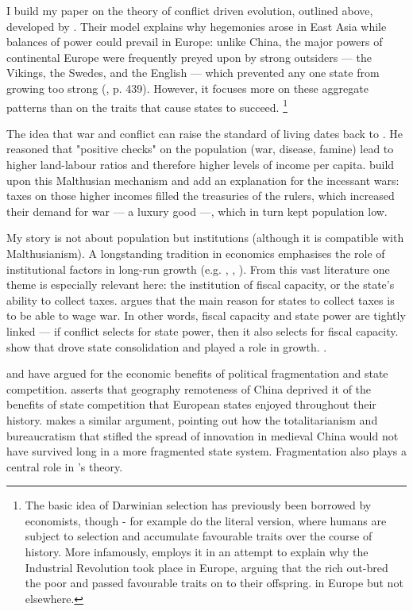 \documentclass{article}
\begin{document}
I build my paper on the theory of conflict driven evolution, outlined above, developed by \cite{levine2013, levine2021, levine2022}. Their model explains why hegemonies arose in East Asia while balances of power could prevail in Europe: unlike China, the major powers of continental Europe were frequently preyed upon by strong outsiders --- the Vikings, the Swedes, and the English --- which prevented any one state from growing too strong (\citealp{levine2021}, p. 439).
However, it focuses more on these aggregate patterns than on the traits that cause states to succeed.
\footnote{The basic idea of Darwinian selection has previously been borrowed by economists, though - for example \cite{galor2002} do the literal version, where humans are subject to selection and accumulate favourable traits over the course of history. More infamously, \cite{clark2007} employs it in an attempt to explain why the Industrial Revolution took place in Europe, arguing that the rich out-bred the poor and passed favourable traits on to their offspring. in Europe but not elsewhere.}

The idea that war and conflict can raise the standard of living dates back to \cite{malthus1798}. He reasoned that "positive checks" on the population (war, disease, famine) lead to higher land-labour ratios and therefore higher levels of income per capita. \cite{voigtlnder2013} build upon this Malthusian mechanism and add an explanation for the incessant wars: taxes on those higher incomes filled the treasuries of the rulers, which increased their demand for war --- a luxury good ---, which in turn kept population low. 

My story is not about population but institutions (although it is compatible with Malthusianism). A longstanding tradition in economics emphasises the role of institutional factors in long-run growth (e.g. \cite{north1970}, \cite{delong1993}, \cite{ajr2001}). From this vast literature one theme is especially relevant here: the institution of fiscal capacity, or the state's ability to collect taxes. \cite{tilly1985} argues that the main reason for states to collect taxes is to be able to wage war. In other words, fiscal capacity and state power are tightly linked --- if conflict selects for state power, then it also selects for fiscal capacity. \cite{cantoni2023} show that drove state consolidation and played a role in growth. \cite{dincecco2012}.  

\cite{diamond1997} and \cite{landes1969, landes2006} have argued for the economic benefits of political fragmentation and state competition. \cite{diamond1997} asserts that geography 
remoteness of China deprived it of the benefits of state competition that European states enjoyed throughout their history. \cite{landes2006} makes a similar argument, pointing out how the totalitarianism and bureaucratism that stifled the spread of innovation in medieval China would not have survived long in a more fragmented state system. Fragmentation also plays a central role in \cite{cervellati2022}'s theory.
\end{document}
